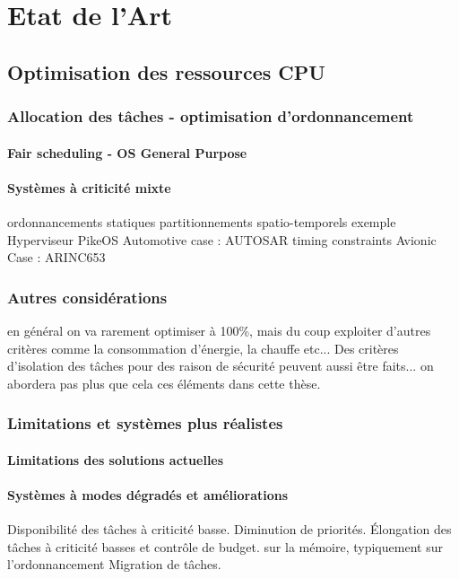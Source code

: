 \documentclass[french, a4paper, 11pt, twoside, pdftex]{StyleThese}
\begin{document}
\setcounter{chapter}{2} %
\dominitoc
\faketableofcontents
\fi

\chapter{Etat de l'Art} \label{chap:2_StateofArt}
\minitoc

\section{Optimisation des ressources CPU}
    \subsection{Allocation des tâches - optimisation d'ordonnancement}
    
        \subsubsection{Fair scheduling - OS General Purpose}
        \subsubsection{Systèmes à criticité mixte}
                ordonnancements statiques
        partitionnements spatio-temporels
            exemple Hyperviseur PikeOS
        Automotive case : AUTOSAR
            timing constraints
        Avionic Case : ARINC653
    \subsection{Autres considérations}
        en général on va rarement optimiser à 100\%, mais du coup exploiter d'autres critères comme la consommation d'énergie, la chauffe etc... Des critères d'isolation des tâches pour des raison de sécurité peuvent aussi être faits... on abordera pas plus que cela ces éléments dans cette thèse.
\subsection{Limitations et systèmes plus réalistes}
    \subsubsection{Limitations des solutions actuelles}
    \subsubsection{Systèmes à modes dégradés et améliorations}
    Disponibilité des tâches à criticité basse.
    Diminution de priorités.
    Élongation des tâches à criticité basses et contrôle de budget. sur la mémoire, \cite{blin_vers_2017} typiquement
            sur l'ordonnancement
    Migration de tâches.



\ifdefined{}
\else


\end{document}
